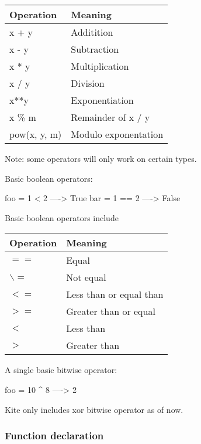 \begin{table}[H]
\centering
    \begin{tabular}{|l|l|}
    \hline
    Operation    & Meaning              \\ \hline
    x + y        & Additition           \\ \hline
    x - y        & Subtraction          \\ \hline
    x * y        & Multiplication       \\ \hline
    x / y        & Division             \\ \hline
    x**y         & Exponentiation       \\ \hline
    x \% m       & Remainder of x / y   \\ \hline
    pow(x, y, m) & Modulo exponentation \\ \hline
    \end{tabular}
\end{table}
Note: some operators will only work on certain types.

Basic boolean operators:
\begin{kite}
  
  foo = 1 < 2  ----> True
  bar = 1 == 2 ----> False
\end{kite}
Basic boolean operators include 
\begin{table}[H]
\centering
    \begin{tabular}{|l|l|}
    \hline
    Operation & Meaning                 \\ \hline
    $==$        & Equal                   \\ \hline
    $\backslash=$        & Not equal               \\ \hline
    $<=$        & Less than or equal than \\ \hline
    $>=$        & Greater than or equal   \\ \hline
    $<$         & Less than               \\ \hline
    $>$         & Greater than            \\ \hline
    \end{tabular}
\end{table}

A single basic bitwise operator:
\begin{kite}
  
  foo = 10 ^ 8 ----> 2
\end{kite}
Kite only includes xor bitwise operator as of now.

\subsubsection{Function declaration}

